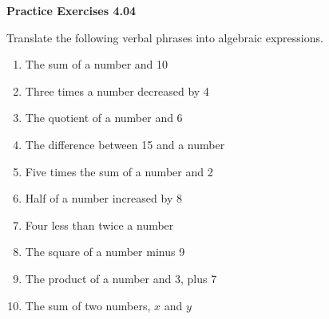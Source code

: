 \vspace{0.3ex}
\noindent\textbf{Practice Exercises 4.04}

\vspace{0.2ex}

Translate the following verbal phrases into algebraic expressions.

\begin{enumerate}
    \item The sum of a number and 10  
    \item Three times a number decreased by 4  
    \item The quotient of a number and 6  
    \item The difference between 15 and a number  
    \item Five times the sum of a number and 2  
    \item Half of a number increased by 8  
    \item Four less than twice a number  
    \item The square of a number minus 9  
    \item The product of a number and 3, plus 7  
    \item The sum of two numbers, \(x\) and \(y\)  
\end{enumerate}
